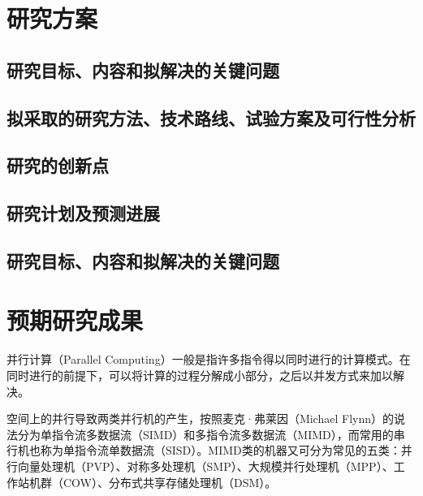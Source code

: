 

\chapter{研究方案}

\section{研究目标、内容和拟解决的关键问题}
\section{拟采取的研究方法、技术路线、试验方案及可行性分析}
\section{研究的创新点}
\section{研究计划及预测进展}
\section{研究目标、内容和拟解决的关键问题}
\chapter{预期研究成果}

并行计算（Parallel Computing）一般是指许多指令得以同时进行的计算模式。在同时进行的前提下，可以将计算的过程分解成小部分，之后以并发方式来加以解决。

空间上的并行导致两类并行机的产生，按照麦克·弗莱因（Michael Flynn）的说法分为单指令流多数据流（SIMD）和多指令流多数据流（MIMD），而常用的串行机也称为单指令流单数据流（SISD）。MIMD类的机器又可分为常见的五类：并行向量处理机（PVP）、对称多处理机（SMP）、大规模并行处理机（MPP）、工作站机群（COW）、分布式共享存储处理机（DSM）。




